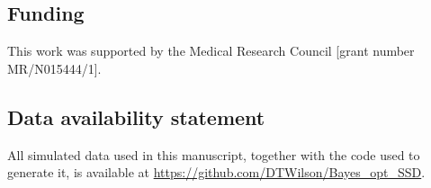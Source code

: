 \documentclass{article}
\begin{document}
\subsection*{Funding}

This work was supported by the Medical Research Council [grant number MR/N015444/1].

\subsection*{Data availability statement}

All simulated data used in this manuscript, together with the code used to generate it, is available at \url{https://github.com/DTWilson/Bayes_opt_SSD}.



\end{document}
